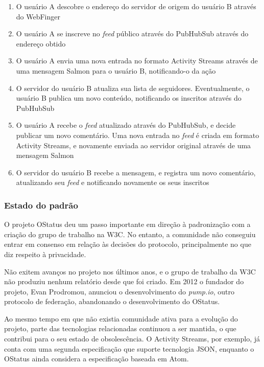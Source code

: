 \begin{enumerate}
  \item{O usuário A descobre o endereço do servidor de origem do usuário B através
        do WebFinger}
  \item{O usuário A se inscreve no \textit{feed} público através do PubHubSub
        através do endereço obtido}
  \item{O usuário A envia uma nova entrada no formato Activity Streams através de
        uma mensagem Salmon para o usuário B, notificando-o da ação}
  \item{O servidor do usuário B atualiza sua lista de seguidores. Eventualmente, o
        usuário B publica um novo conteúdo, notificando os inscritos através do
        PubHubSub}
  \item{O usuário A recebe o \textit{feed} atualizado através do PubHubSub, e decide
        publicar um novo comentário. Uma nova entrada no \textit{feed} é criada em
        formato Activity Streams, e novamente enviada ao servidor original através
        de uma mensagem Salmon}
  \item{O servidor do usuário B recebe a mensagem, e registra um novo comentário,
        atualizando seu \textit{feed} e notificando novamente os seus inscritos}
\end{enumerate}

\subsubsection{Estado do padrão}

O projeto OStatus deu um passo importante em direção à padronização com a criação do
grupo de trabalho na W3C. No entanto, a comunidade não conseguiu entrar em consenso
em relação às decisões do protocolo, principalmente no que diz respeito à
privacidade.

Não exitem avanços no projeto nos últimos anos, e o grupo de trabalho da W3C não
produziu nenhum relatório desde que foi criado. Em 2012 o fundador do projeto, Evan
Prodromou, anunciou o desenvolvimento do \textit{pump.io}, outro protocolo de
federação, abandonando o desenvolvimento do OStatus.

Ao mesmo tempo em que não existia comunidade ativa para a evolução do projeto, parte
das tecnologias relacionadas continuou a ser mantida, o que contribui para o seu
estado de obsolescência. O Activity Streams, por exemplo, já conta com uma segunda
especificação que suporte tecnologia JSON, enquanto o OStatus ainda considera a
especificação baseada em Atom.


